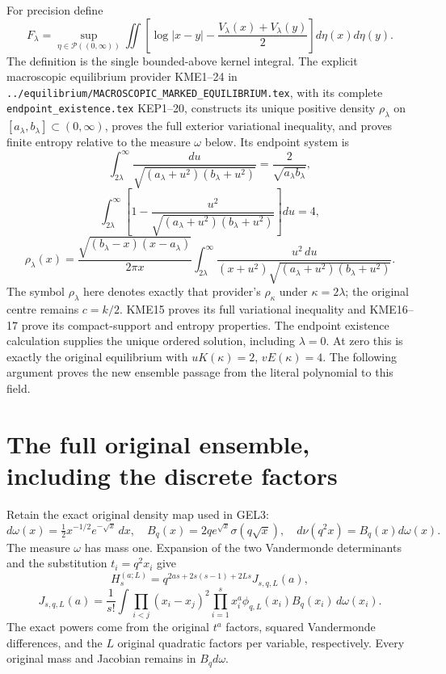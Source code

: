 \documentclass[11pt,a4paper]{article}
\begin{document}
For precision define
\[
 F_\lambda=\sup_{\eta\in\mathcal P((0,\infty))}
 \iint\left[\log|x-y|-\frac{V_\lambda(x)+V_\lambda(y)}2\right]
                         d\eta(x)d\eta(y).
 \tag{MFG12}
\]
The definition is the single bounded-above kernel integral. The explicit
macroscopic equilibrium provider KME1--24 in
\texttt{../equilibrium/MACROSCOPIC\_MARKED\_EQUILIBRIUM.tex}, with
its complete \texttt{endpoint\_existence.tex} KEP1--20, constructs
its unique positive density
$\rho_\lambda$ on $[a_\lambda,b_\lambda]\subset(0,\infty)$, proves
the full exterior variational inequality, and proves finite entropy
relative to the measure $\omega$ below. Its endpoint system is
\[
 \int_{2\lambda}^{\infty}
       \frac{du}{\sqrt{(a_\lambda+u^2)(b_\lambda+u^2)}}
       =\frac2{\sqrt{a_\lambda b_\lambda}},
\]
\[
 \int_{2\lambda}^{\infty}\left[1-
       \frac{u^2}{\sqrt{(a_\lambda+u^2)(b_\lambda+u^2)}}\right]du=4,
\]
\[
 \rho_\lambda(x)=\frac{\sqrt{(b_\lambda-x)(x-a_\lambda)}}{2\pi x}
 \int_{2\lambda}^{\infty}
       \frac{u^2\,du}{(x+u^2)
              \sqrt{(a_\lambda+u^2)(b_\lambda+u^2)}}.
 \tag{MFG13}
\]
The symbol $\rho_\lambda$ here denotes exactly that provider's
$\rho_\kappa$ under $\kappa=2\lambda$; the original centre remains
$c=k/2$. KME15 proves its full variational inequality and KME16--17
prove its compact-support and entropy properties.
The endpoint existence calculation supplies the unique ordered solution,
including $\lambda=0$. At zero this is exactly the original equilibrium
with $uK(\kappa)=2$, $vE(\kappa)=4$. The following argument proves the
new ensemble passage from the literal polynomial to this field.

\section{The full original ensemble, including the discrete factors}

Retain the exact original density map used in GEL3:
\[
 d\omega(x)=\tfrac12x^{-1/2}e^{-\sqrt x}\,dx,
 \quad B_q(x)=2qe^{\sqrt x}\sigma(q\sqrt x),
 \quad d\nu(q^2x)=B_q(x)d\omega(x).
\]
The measure $\omega$ has mass one. Expansion of the two Vandermonde
determinants and the substitution $t_i=q^2x_i$ give
\[
 \boxed{H_s^{(a;L)}
 =q^{2as+2s(s-1)+2Ls}J_{s,q,L}(a),}
\]
\[
 J_{s,q,L}(a)=\frac1{s!}\int
       \prod_{i<j}(x_i-x_j)^2
       \prod_{i=1}^s x_i^a\phi_{q,L}(x_i)B_q(x_i)\,d\omega(x_i).
 \tag{MFG14}
\]
The exact powers come from the original $t^a$ factors, squared
Vandermonde differences, and the $L$ original quadratic factors per
variable, respectively. Every original mass and Jacobian remains in
$B_qd\omega$.
\end{document}
